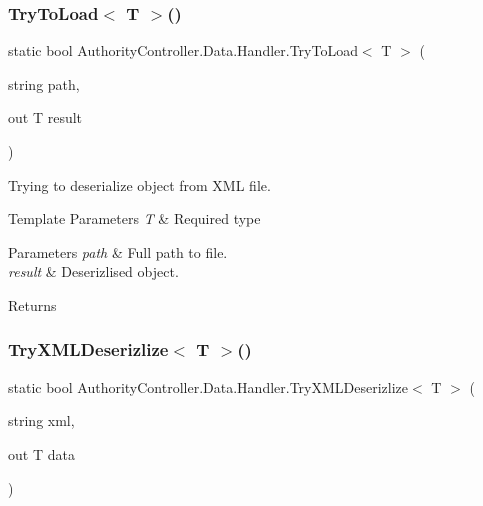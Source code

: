 \subsubsection{\texorpdfstring{Try\+To\+Load$<$ T $>$()}{TryToLoad< T >()}}
{\footnotesize\ttfamily static bool Authority\+Controller.\+Data.\+Handler.\+Try\+To\+Load$<$ T $>$ (\begin{DoxyParamCaption}\item[{string}]{path,  }\item[{out T}]{result }\end{DoxyParamCaption})\hspace{0.3cm}{\ttfamily [static]}}



Trying to deserialize object from X\+ML file. 


\begin{DoxyTemplParams}{Template Parameters}
{\em T} & Required type\\
\hline
\end{DoxyTemplParams}

\begin{DoxyParams}{Parameters}
{\em path} & Full path to file.\\
\hline
{\em result} & Deserizlised object.\\
\hline
\end{DoxyParams}
\begin{DoxyReturn}{Returns}

\end{DoxyReturn}
\mbox{\label{class_authority_controller_1_1_data_1_1_handler_a086874112fede63b9d3bb8c070698c55}} 
\subsubsection{\texorpdfstring{Try\+X\+M\+L\+Deserizlize$<$ T $>$()}{TryXMLDeserizlize< T >()}}
{\footnotesize\ttfamily static bool Authority\+Controller.\+Data.\+Handler.\+Try\+X\+M\+L\+Deserizlize$<$ T $>$ (\begin{DoxyParamCaption}\item[{string}]{xml,  }\item[{out T}]{data }\end{DoxyParamCaption})\hspace{0.3cm}{\ttfamily [static]}}




